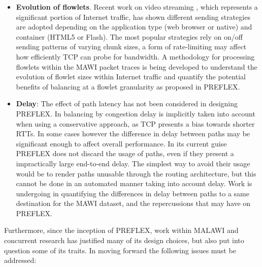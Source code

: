 \begin{itemize}
\item{
    \textbf{Evolution of flowlets}. Recent work on video streaming \cite{Rao:2011p547} , which represents a significant portion of Internet traffic, 
    has shown different sending strategies are adopted depending on the application type (web browser or native) and container (HTML5 or Flash).
    The most popular strategies rely on on/off sending patterns of varying chunk sizes, a form of rate-limiting may affect how efficiently \ac{TCP} can probe for bandwidth.
    A methodology for processing flowlets within the \ac{MAWI} packet traces is being developed to understand the evolution of flowlet sizes within Internet traffic and quantify the potential benefits of balancing at a flowlet granularity as proposed in \ac{PREFLEX}.
}

\item{
    \textbf{Delay}: The effect of path latency has not been considered in designing \ac{PREFLEX}.
    In balancing by congestion delay is implicitly taken into account when using a conservative approach, as \ac{TCP} presents a bias towards shorter \acp{RTT}.
    In some cases however the difference in delay between paths may be significant enough to affect overall performance.
    In its current guise \ac{PREFLEX} does not discard the usage of paths, even if they present a impractically large end-to-end delay.
    The simplest way to avoid their usage would be to render paths unusable through the routing architecture, but this cannot be done in an automated manner taking into account delay.
    Work is undergoing in quantifying the differences in delay between paths to a same destination for the \ac{MAWI} dataset, and the repercussions that may have on \ac{PREFLEX}.
}
\end{itemize}

Furthermore, since the inception of \ac{PREFLEX}, work within \ac{MALAWI} and concurrent research has justified many of its design choices, but also put into question some of its traits.
In moving forward the following issues must be addressed:

